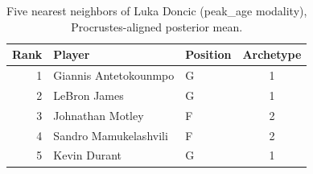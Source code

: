 \begin{table}[htbp]
  \centering\small
  \begin{tabular}{rllc}
    \toprule
    Rank & Player & Position & Archetype \\
    \midrule
    1 & Giannis Antetokounmpo & G & 1 \\
    2 & LeBron James & G & 1 \\
    3 & Johnathan Motley & F & 2 \\
    4 & Sandro Mamukelashvili & F & 2 \\
    5 & Kevin Durant & G & 1 \\
    \bottomrule
  \end{tabular}
  \caption{Five nearest neighbors of Luka Doncic (peak_age modality), Procrustes-aligned posterior mean.}
  \label{tab:Luka_Doncic_neighbors_peak_age}
\end{table}

